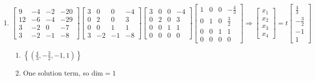 \documentclass[12pt]{article}
\begin{document}
\begin{enumerate}
  \item $\begin{bmatrix} 9 & -4 & -2 & -20\\ 12 & -6 & -4 & -29\\ 3 & -2 & 0 & -7\\ 3 & -2 & -1 & -8  \end{bmatrix}\widetilde{ }\begin{bmatrix} 3 & 0 & 0 & -4\\ 0 & 2 & 0 & 3\\ 0 & 0 & 1 & 1\\ 3 & -2 & -1 & -8  \end{bmatrix}\widetilde{ }\begin{bmatrix} 3 & 0 & 0 & -4\\ 0 & 2 & 0 & 3\\ 0 & 0 & 1 & 1\\ 0 & 0 & 0 & 0  \end{bmatrix}\widetilde{ }\begin{bmatrix} 1 & 0 & 0 & -\frac{4}{3}\\ 0 & 1 & 0 & \frac{3}{2}\\ 0 & 0 & 1 & 1\\ 0 & 0 & 0 & 0 \end{bmatrix}\Rightarrow\begin{bmatrix}x_1\\x_2\\x_3\\x_4\end{bmatrix}=t\begin{bmatrix}\frac{4}{3}\\-\frac{3}{2}\\-1\\1\end{bmatrix}$

    \begin{enumerate}

      \item $\left\{ \left( \frac{4}{3},-\frac{3}{2},-1,1 \right) \right\}$

      \item One solution term, so dim$=1$

    \end{enumerate}

\end{enumerate}
\end{document}
